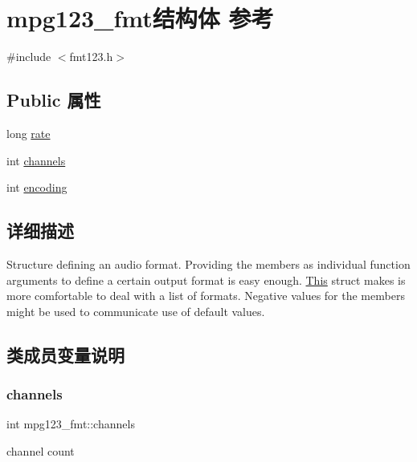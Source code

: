 \hypertarget{structmpg123__fmt}{}\section{mpg123\+\_\+fmt结构体 参考}
\label{structmpg123__fmt}


{\ttfamily \#include $<$fmt123.\+h$>$}

\subsection*{Public 属性}
\begin{DoxyCompactItemize}
\item 
long \hyperlink{structmpg123__fmt_ac28086d4f9023626dbbf2ba6601a108e}{rate}
\item 
int \hyperlink{structmpg123__fmt_a01661ec41c254e387a17c90f0e61df91}{channels}
\item 
int \hyperlink{structmpg123__fmt_a7c9ec01e750a071c97cea442617e802e}{encoding}
\end{DoxyCompactItemize}


\subsection{详细描述}
Structure defining an audio format. Providing the members as individual function arguments to define a certain output format is easy enough. \hyperlink{namespace_this}{This} struct makes is more comfortable to deal with a list of formats. Negative values for the members might be used to communicate use of default values. 

\subsection{类成员变量说明}
\mbox{\label{structmpg123__fmt_a01661ec41c254e387a17c90f0e61df91}} 
\subsubsection{\texorpdfstring{channels}{channels}}
{\footnotesize\ttfamily int mpg123\+\_\+fmt\+::channels}

channel count \mbox{\label{structmpg123__fmt_a7c9ec01e750a071c97cea442617e802e}} 
